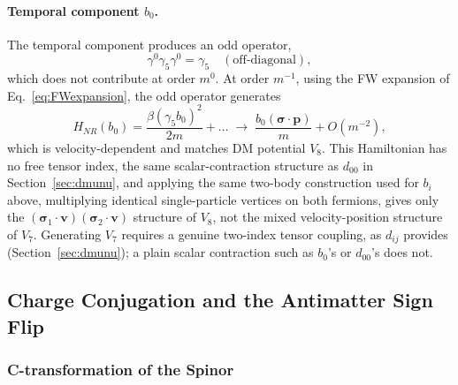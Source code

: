 \documentclass[main]{subfiles}
\begin{document}
\paragraph{Temporal component $b_0$.} The temporal component produces an odd
operator,
\begin{equation}
  \gamma^0\gamma_5\gamma^0 = \gamma_5 \quad (\text{off-diagonal}),
\end{equation}
which does not contribute at order $m^0$. At order $m^{-1}$, using the FW
expansion of Eq.~\eqref{eq:FWexpansion}, the odd operator generates
\begin{equation}
  H_{NR}(b_0) = \frac{\beta(\gamma_5 b_0)^2}{2m} + \ldots
  \;\longrightarrow\; \frac{b_0(\boldsymbol\sigma\cdot\mathbf p)}{m}
  + O(m^{-2}),
\end{equation}
which is velocity-dependent and matches DM potential $V_8$. This
Hamiltonian has no free tensor index, the same scalar-contraction
structure as $d_{00}$ in Section~\ref{sec:dmunu}, and applying the same
two-body construction used for $b_i$ above, multiplying identical
single-particle vertices on both fermions, gives only the
$(\boldsymbol\sigma_1\cdot\mathbf v)(\boldsymbol\sigma_2\cdot\mathbf v)$
structure of $V_8$, not the mixed velocity-position structure of $V_7$.
Generating $V_7$ requires a genuine two-index tensor coupling, as
$d_{ij}$ provides (Section~\ref{sec:dmunu}); a plain scalar contraction
such as $b_0$'s or $d_{00}$'s does not.

\subsection{Charge Conjugation and the Antimatter Sign Flip}
\label{sec:bmu-cconj}

\subsubsection{C-transformation of the Spinor}
\end{document}
